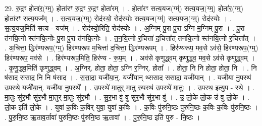 \documentclass[17pt]{extarticle}
\begin{document}
29. रु॒द्रꣳ होता॑र॒(ग्म्॒) होता॑रꣳ रु॒द्रꣳ रु॒द्रꣳ होता॑रम् । . होता॑रꣳ सत्य॒यज(ग्म्॑) सत्य॒यज॒(ग्म्॒) होता॑र॒(ग्म्॒) होता॑रꣳ सत्य॒यज᳚म् । . स॒त्य॒यज॒(ग्म्॒) रोद॑स्यो॒ रोद॑स्योः सत्य॒यज(ग्म्॑) सत्य॒यज॒(ग्म्॒) रोद॑स्योः । . स॒त्य॒यज॒मिति॑ सत्य - यज᳚म् । . रोद॑स्यो॒रिति॒ रोद॑स्योः । . अ॒ग्निम् पु॒रा पु॒रा ऽग्नि म॒ग्निम् पु॒रा । . पु॒रा त॑नयि॒त्नो स्त॑नयि॒त्नोः पु॒रा पु॒रा त॑नयि॒त्नोः । . त॒न॒यि॒त्नो र॒चित्ता॑ द॒चित्ता᳚त् तनयि॒त्नो स्त॑नयि॒त्नो र॒चित्ता᳚त् । . अ॒चित्ता॒ द्धिर॑ण्यरूप॒(ग्म्॒) हिर॑ण्यरूप म॒चित्ता॑ द॒चित्ता॒ द्धिर॑ण्यरूपम् । . हिर॑ण्यरूप॒ मव॒से ऽव॑से॒ हिर॑ण्यरूप॒(ग्म्॒) हिर॑ण्यरूप॒ मव॑से । . हिर॑ण्यरूप॒मिति॒ हिर॑ण्य - रू॒प॒म् । . अव॑से कृणुद्ध्वम् कृणुद्ध्व॒ मव॒से ऽव॑से कृणुद्ध्वम् । . कृ॒णु॒द्ध्व॒मिति॑ कृणुद्ध्वम् । . अ॒ग्निर्. होता॒ होता॒ ऽग्नि र॒ग्निर्. होता᳚ । . होता॒ नि नि होता॒ होता॒ नि । . नि ष॑साद ससाद॒ नि नि ष॑साद । . स॒सा॒दा॒ यजी॑या॒न्॒. यजी॑यान् थ्ससाद ससादा॒ यजी॑यान् । . यजी॑या नु॒पस्थ॑ उ॒पस्थे॒ यजी॑या॒न्॒. यजी॑या नु॒पस्थे᳚ । . उ॒पस्थे॑ मा॒तुर् मा॒तु रु॒पस्थ॑ उ॒पस्थे॑ मा॒तुः । . उ॒पस्थ॒ इत्यु॒प - स्थे॒ । . मा॒तुः सु॑र॒भौ सु॑र॒भौ मा॒तुर् मा॒तुः सु॑र॒भौ । . सु॒र॒भा वु॑ वु सुर॒भौ सु॑र॒भा वु॑ । . उ॒ लो॒के लो॒क उ॑ वु लो॒के । . लो॒क इति॑ लो॒के । . युवा॑ क॒विः क॒विर् युवा॒ युवा॑ क॒विः । . क॒विः पु॑रुनि॒ष्ठः पु॑रुनि॒ष्ठः क॒विः क॒विः पु॑रुनि॒ष्ठः । . पु॒रु॒नि॒ष्ठ ऋ॒ताव॒र्तावा॑ पुरुनि॒ष्ठः पु॑रुनि॒ष्ठ ऋ॒तावा᳚ । . पु॒रु॒नि॒ष्ठ इति॑ पुरु - नि॒ष्ठः । \newline
\end{document}
